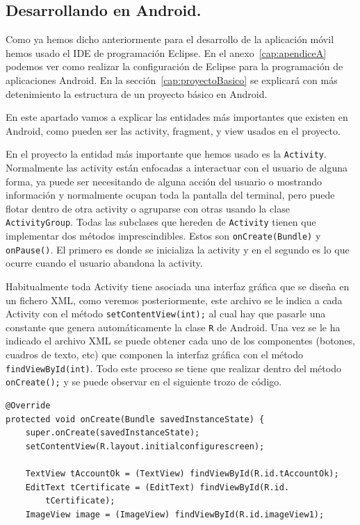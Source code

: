 \begin{itemize}
\subsection{Desarrollando en Android.}\label{cap:desarrolandoAndroid}

Como ya hemos dicho anteriormente para el desarrollo de la aplicación móvil hemos usado el IDE de programación Eclipse. En el anexo~\ref{cap:apendiceA} podemos ver como realizar la configuración de Eclipse para la programación de aplicaciones Android. En la sección~\ref{cap:proyectoBasico} se explicará con más detenimiento la estructura de un proyecto básico en Android.

En este apartado vamos a explicar las entidades más importantes que existen en Android, como pueden ser las activity, fragment, y view usados en el proyecto.

En el proyecto la entidad más importante que hemos usado es la \lstinline{Activity}. Normalmente las activity están enfocadas a interactuar con el usuario de alguna forma, ya puede ser necesitando de alguna acción del usuario o mostrando información y normalmente ocupan toda la pantalla del terminal, pero puede flotar dentro de otra activity o agruparse con otras usando la clase \lstinline{ActivityGroup}. Todas las subclases que hereden de \lstinline{Activity} tienen que implementar dos métodos imprescindibles. Estos son \lstinline{onCreate(Bundle)} y \lstinline{onPause()}. El primero es donde se inicializa la activity y en el segundo es lo que ocurre cuando el usuario abandona la activity.

Habitualmente toda Activity tiene asociada una interfaz gráfica que se diseña en un fichero XML, como veremos posteriormente, este archivo se le indica a cada Activity con el método \lstinline{setContentView(int);} al cual hay que pasarle una constante que genera automáticamente la clase \lstinline{R} de Android. Una vez se le ha indicado el archivo XML se puede obtener cada uno de los componentes (botones, cuadros de texto, etc) que componen la interfaz gráfica con el método \lstinline{findViewById(int)}. Todo este proceso se tiene que realizar dentro del método \lstinline{onCreate();} y se puede observar en el siguiente trozo de código.

\begin{lstlisting}[style=Java]
@Override
protected void onCreate(Bundle savedInstanceState) {
	super.onCreate(savedInstanceState);
	setContentView(R.layout.initialconfigurescreen);

	TextView tAccountOk = (TextView) findViewById(R.id.tAccountOk);
	EditText tCertificate = (EditText) findViewById(R.id.
		tCertificate);
	ImageView image = (ImageView) findViewById(R.id.imageView1);


\end{lstlisting}
\end{itemize}
